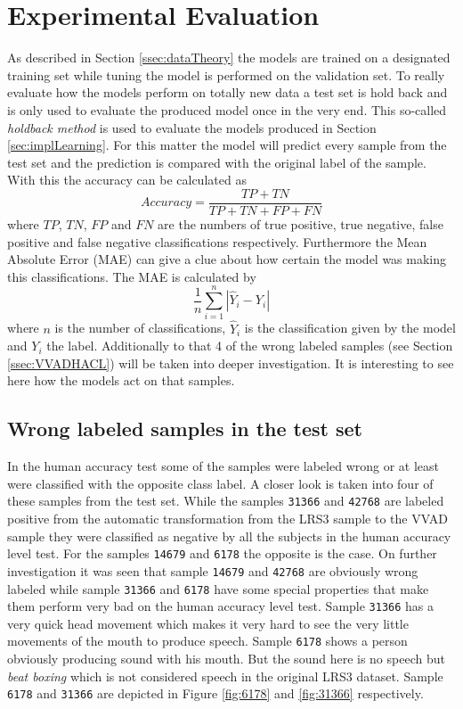 \chapter{Experimental Evaluation}
\label{cha:eval}
As described in Section \ref{ssec:dataTheory} the models are trained on a designated training set while tuning the model is performed on the validation set.
To really evaluate how the models perform on totally new data a test set is hold back and is only used to evaluate the produced model once in the very end.
This so-called \emph{holdback method} is used to evaluate the models produced in Section \ref{sec:implLearning}.
For this matter the model will predict every sample from the test set and the prediction is compared with the original label of the sample.
With this the accuracy can be calculated as
\begin{equation}
Accuracy = \frac{TP + TN}{TP + TN + FP + FN}
\end{equation}
where $TP$, $TN$, $FP$ and $FN$ are the numbers of true positive, true negative, false positive and false negative classifications respectively.
Furthermore the Mean Absolute Error (MAE) can give a clue about how certain the model was making this classifications.
The MAE is calculated by 
\begin{equation}
\frac{1}{n} \sum_{i=1}^n |\hat{Y}_i - Y_i|
\end{equation}
where $n$ is the number of classifications, $\hat{Y}_i$ is the classification given by the model and $Y_i$ the label.
Additionally to that 4 of the wrong labeled samples (see Section \ref{ssec:VVADHACL}) will be taken into deeper investigation.
It is interesting to see here how the models act on that samples. 

\section{Wrong labeled samples in the test set}\label{sec:wrongLabels}
In the human accuracy test some of the samples were labeled wrong or at least were classified with the opposite class label.
A closer look is taken into four of these samples from the test set.
While the samples \texttt{31366} and \texttt{42768} are labeled positive from the automatic transformation from the LRS3 sample to the VVAD sample they were classified as negative by all the subjects in the human accuracy level test.
For the samples \texttt{14679} and \texttt{6178} the opposite is the case.
On further investigation it was seen that sample \texttt{14679} and \texttt{42768} are obviously wrong labeled while sample \texttt{31366} and \texttt{6178} have some special properties that make them perform very bad on the human accuracy level test.
Sample \texttt{31366} has a very quick head movement which makes it very hard to see the very little movements of the mouth to produce speech.
Sample \texttt{6178} shows a person obviously producing sound with his mouth.
But the sound here is no speech but \emph{beat boxing} which is not considered speech in the original LRS3 dataset.
Sample \texttt{6178} and \texttt{31366} are depicted in Figure \ref{fig:6178} and \ref{fig:31366} respectively.

